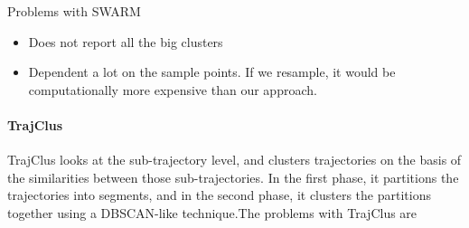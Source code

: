 Problems with SWARM 
\begin{itemize}
\item Does not report all the big clusters
\item Dependent a lot on the sample points. If we resample, it would be computationally more expensive than our approach.
\end{itemize}

\paragraph{TrajClus}

TrajClus looks at the sub-trajectory level, and clusters trajectories on the basis of the similarities between those sub-trajectories. In the first phase, it partitions the trajectories into segments, and in the second phase, it clusters the partitions together using a DBSCAN-like technique.The problems with TrajClus are
